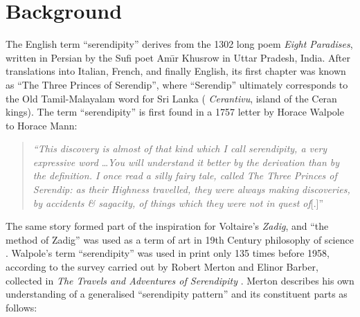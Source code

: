 \section{Background} \label{sec:literature-review}
The English term ``serendipity'' derives from the 1302 long poem \emph{Eight Paradises}, written in Persian by the Sufi poet Am\={\i}r Khusrow in Uttar Pradesh, India.  After translations into Italian, French, and finally English, its first chapter was known as ``The Three Princes of Serendip'', where ``Serendip'' ultimately corresponds to the Old Tamil-Malayalam word for Sri Lanka (%
\emph{Cerantivu}, island of the Ceran kings).
%
The term ``serendipity'' is first found in a 1757 letter by Horace Walpole to Horace Mann:
\begin{quote}
\emph{``This discovery is almost of that kind which I call serendipity, a very expressive
word} \ldots \emph{You will understand it better by the derivation than by the
definition. I once read a silly fairy tale, called The Three Princes of Serendip:
as their Highness travelled, they were always making discoveries, by accidents
\& sagacity, of things which they were not in quest of}[.]''~\cite[p. 633]{van1994anatomy}
\end{quote}
The same story formed part of the inspiration for Voltaire's \emph{Zadig}, and ``the method of Zadig'' was used as a term of art in 19th Century philosophy of science \cite{huxley1894science}.
Walpole's term ``serendipity'' was used in print only 135 times before 1958, according to the survey carried out by Robert Merton and Elinor Barber, collected in \emph{The Travels and Adventures of Serendipity} \citep{merton}.  Merton describes his own understanding of a generalised ``serendipity pattern'' and its constituent parts as follows:

